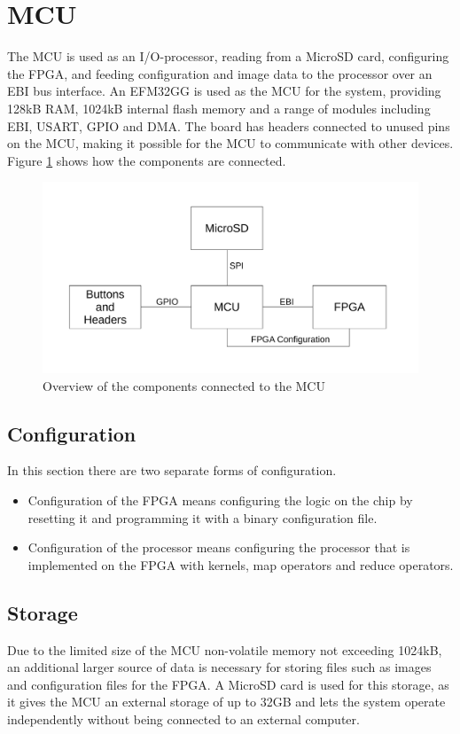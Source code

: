 \section{MCU}

The MCU is used as an I/O-processor, reading from a MicroSD card, configuring the FPGA, and feeding configuration and image data to the processor over an EBI bus interface. An EFM32GG is used as the MCU for the system, providing 128kB RAM, 1024kB internal flash memory and a range of modules including EBI, USART, GPIO and DMA. The board has headers connected to unused pins on the MCU, making it possible for the MCU to communicate with other devices. Figure \ref{fig:mcuOverview} shows how the components are connected.

\begin{figure}[h!]
    \includegraphics[width=\linewidth]{img/mcu_overview.pdf}
    \caption{Overview of the components connected to the MCU}
    \label{fig:mcuOverview}
\end{figure}

\subsection{Configuration}
In this section there are two separate forms of configuration. 
\begin{itemize}
	\item Configuration of the FPGA means configuring the logic on the chip by resetting it and programming it with a binary configuration file.
	\item Configuration of the processor means configuring the processor that is implemented on the FPGA with kernels, map operators and reduce operators.
\end{itemize}

\subsection{Storage}
Due to the limited size of the MCU non-volatile memory not exceeding 1024kB, an additional larger source of data is necessary for storing files such as images and configuration files for the FPGA. A MicroSD card is used for this storage, as it gives the MCU an external storage of up to 32GB and lets the system operate independently without being connected to an external computer.

